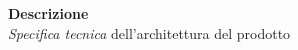 \begin{titlepage}
\begin{center}
	\large \textbf{Descrizione} \\ \textit{Specifica tecnica} dell'architettura del prodotto
	
	\end{center}
\end{titlepage}
